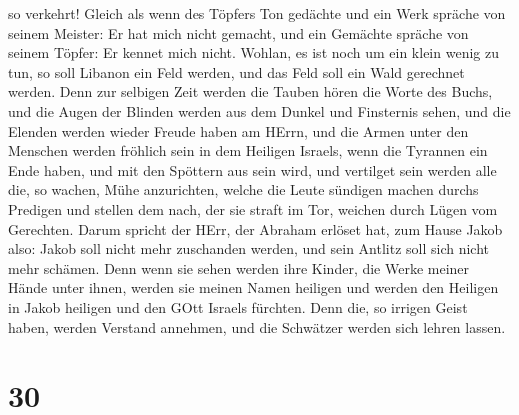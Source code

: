 so verkehrt! Gleich als wenn des Töpfers Ton gedächte und ein Werk
spräche von seinem Meister: Er hat mich nicht gemacht, und ein Gemächte
spräche von seinem Töpfer: Er kennet mich nicht.  Wohlan,
es ist noch um ein klein wenig zu tun, so soll Libanon ein Feld werden,
und das Feld soll ein Wald gerechnet werden.  Denn zur
selbigen Zeit werden die Tauben hören die Worte des Buchs, und die Augen
der Blinden werden aus dem Dunkel und Finsternis sehen, 
und die Elenden werden wieder Freude haben am HErrn, und die Armen unter
den Menschen werden fröhlich sein in dem Heiligen Israels, 
wenn die Tyrannen ein Ende haben, und mit den Spöttern aus sein wird,
und vertilget sein werden alle die, so wachen, Mühe anzurichten,
 welche die Leute sündigen machen durchs Predigen und
stellen dem nach, der sie straft im Tor, weichen durch Lügen vom
Gerechten.  Darum spricht der HErr, der Abraham erlöset
hat, zum Hause Jakob also: Jakob soll nicht mehr zuschanden werden, und
sein Antlitz soll sich nicht mehr schämen.  Denn wenn sie
sehen werden ihre Kinder, die Werke meiner Hände unter ihnen, werden sie
meinen Namen heiligen und werden den Heiligen in Jakob heiligen und den
GOtt Israels fürchten.  Denn die, so irrigen Geist haben,
werden Verstand annehmen, und die Schwätzer werden sich lehren lassen.

\hypertarget{section-29}{%
\section{30}\label{section-29}}

